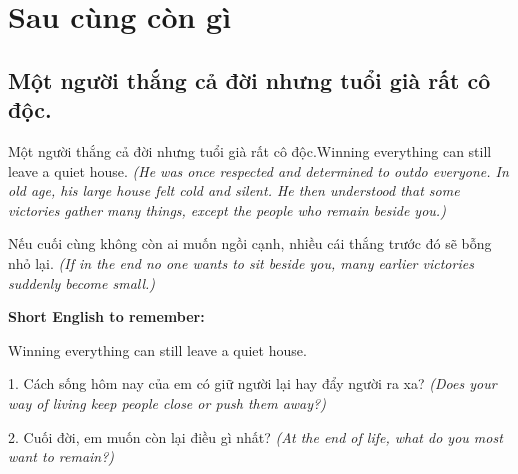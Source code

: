 \chapter{Sau cùng còn gì}

\section{Một người thắng cả đời nhưng tuổi già rất cô độc.}
\begin{truyen}{Một người thắng cả đời nhưng tuổi già rất cô độc.}{Winning everything can still leave a quiet house.}
\textit{(He was once respected and determined to outdo everyone. In old age, his large house felt cold and silent. He then understood that some victories gather many things, except the people who remain beside you.)}
\end{truyen}
\begin{baihoc}
Nếu cuối cùng không còn ai muốn ngồi cạnh, nhiều cái thắng trước đó sẽ bỗng nhỏ lại.
\textit{(If in the end no one wants to sit beside you, many earlier victories suddenly become small.)}
\end{baihoc}
\begin{ghinhoanh}\textbf{Short English to remember:}

Winning everything can still leave a quiet house.
\end{ghinhoanh}
\begin{tuhocnhanh}
1. Cách sống hôm nay của em có giữ người lại hay đẩy người ra xa? \textit{(Does your way of living keep people close or push them away?)}

2. Cuối đời, em muốn còn lại điều gì nhất? \textit{(At the end of life, what do you most want to remain?)}
\end{tuhocnhanh}
\ngancach

